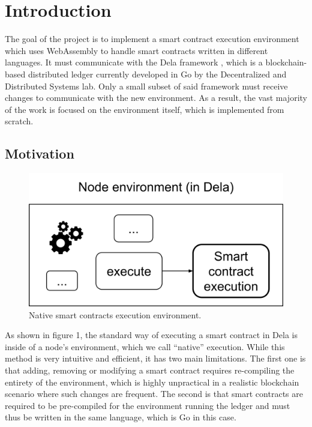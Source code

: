 \documentclass[11pt, a4paper, twoside, openright]{article}
\begin{document}


\newpage
\setcounter{page}{1}
\tableofcontents
\newpage
        

\section{Introduction}
The goal of the project is to implement a smart contract execution environment which uses WebAssembly \cite{webassembly} to handle smart contracts written in different languages. It must communicate with the Dela framework \cite{dela}, which is a blockchain-based distributed ledger currently developed in Go by the Decentralized and Distributed Systems lab.
Only a small subset of said framework must receive changes to communicate with the new environment. As a result, the vast majority of the work is focused on the environment itself, which is implemented from scratch.

\subsection{Motivation}

\begin{figure}[htbp]
 \centering
  \includegraphics[width=12cm]{wasm1.png}
  \caption{Native smart contracts execution environment.}
\end{figure}


As shown in figure 1, the standard way of executing a smart contract in Dela is inside of a node's environment, which we call ``native'' execution. While this method is very intuitive and efficient, it has two main limitations. The first one is that adding, removing or modifying a smart contract requires re-compiling the entirety of the environment, which is highly unpractical in a realistic blockchain scenario where such changes are frequent. The second is that smart contracts are required to be pre-compiled for the environment running the ledger and must thus be written in the same language, which is Go in this case.
\end{document}
